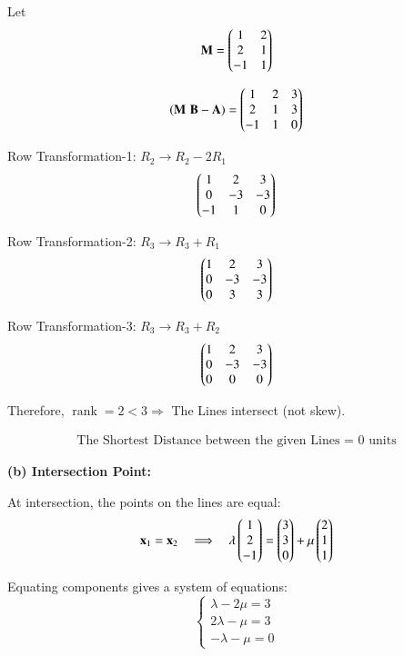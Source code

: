 \documentclass[journal]{IEEEtran}
\begin{document}
Let
\[
\mathbf{M} = \begin{pmatrix}1 & 2 \\ 2 & 1 \\ -1 & 1\end{pmatrix}
\]

\begin{equation}
    (\mathbf{M} \, \, \mathbf{B}-\mathbf{A}) = \begin{pmatrix}1 & 2 & 3 \\ 2 & 1 & 3 \\ -1 & 1 & 0\end{pmatrix}
\end{equation}

Row Transformation-1: $R_2 \rightarrow R_2 - 2R_1$
\begin{equation}
\begin{pmatrix}1 & 2 & 3 \\ 0 & -3 & -3 \\ -1 & 1 & 0\end{pmatrix}
\end{equation}

Row Transformation-2: $R_3 \rightarrow R_3 + R_1$
\begin{equation}
\begin{pmatrix}1 & 2 & 3 \\ 0 & -3 & -3 \\ 0 & 3 & 3\end{pmatrix}
\end{equation}

Row Transformation-3: $R_3 \rightarrow R_3 + R_2$
\begin{equation}
\begin{pmatrix}1 & 2 & 3 \\ 0 & -3 & -3 \\ 0 & 0 & 0\end{pmatrix}
\end{equation}

Therefore, \(\operatorname{rank}=2 < 3 \Rightarrow\) The Lines intersect (not skew).

\begin{align}
    \boxed{\text{The Shortest Distance between the given Lines = } 0 \text{ units}}
\end{align}

\textbf{(b) Intersection Point:} 

At intersection, the points on the lines are equal:
\[
\mathbf{x}_1 = \mathbf{x}_2 \quad \Longrightarrow \quad
\lambda\begin{pmatrix}1\\2\\-1\end{pmatrix} = \begin{pmatrix}3\\3\\0\end{pmatrix} + \mu\begin{pmatrix}2\\1\\1\end{pmatrix}
\]

Equating components gives a system of equations:
\[
\begin{cases}
\lambda - 2 \mu = 3 \\[1mm]
2 \lambda - \mu = 3 \\[1mm]
- \lambda - \mu = 0
\end{cases}
\]
\end{document}
